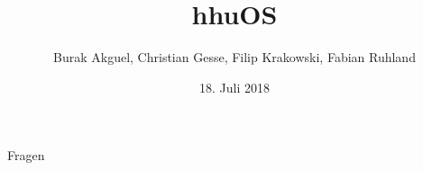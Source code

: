 \documentclass[german,aspectratio=169]{beamer}
\title{hhuOS}
\date{18. Juli 2018}
\author{Burak Akguel, Christian Gesse, Filip Krakowski, Fabian Ruhland}
\institute{Institute of Computer Science \\
	Heinrich-Heine-University Düsseldorf}
\begin{document}
	
	\maketitle
	
	
	
	

	

	
	
	
	
	\begin{frame}[standout]
			\Large Fragen
	\end{frame}
\end{document}
